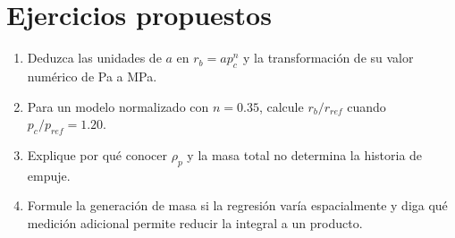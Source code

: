 \section{Ejercicios propuestos}
\begin{enumerate}
\item Deduzca las unidades de $a$ en $r_b=ap_c^n$ y la transformación de su valor numérico de Pa a MPa.
\item Para un modelo normalizado con $n=0.35$, calcule $r_b/r_{ref}$ cuando $p_c/p_{ref}=1.20$.
\item Explique por qué conocer $\rho_p$ y la masa total no determina la historia de empuje.
\item Formule la generación de masa si la regresión varía espacialmente y diga qué medición adicional permite reducir la integral a un producto.
\end{enumerate}


\studiumchaptercheck
